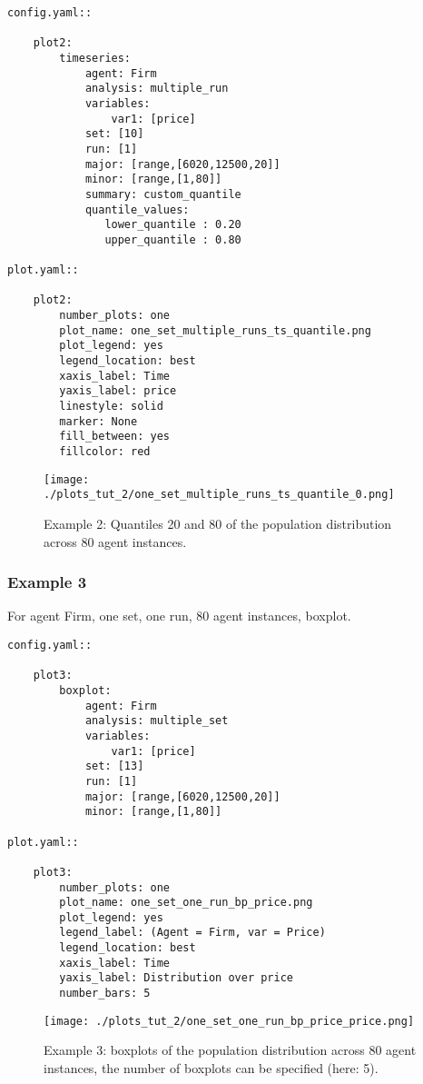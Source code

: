 \documentclass[10pt,a4paper]{article}
\begin{document}
\begin{lstlisting}
config.yaml::

    plot2:
        timeseries:
            agent: Firm
            analysis: multiple_run
            variables:
                var1: [price]
            set: [10]
            run: [1]
            major: [range,[6020,12500,20]]
            minor: [range,[1,80]] 
            summary: custom_quantile
            quantile_values:          
               lower_quantile : 0.20
               upper_quantile : 0.80

plot.yaml::

    plot2:
        number_plots: one
        plot_name: one_set_multiple_runs_ts_quantile.png
        plot_legend: yes
        legend_location: best
        xaxis_label: Time
        yaxis_label: price
        linestyle: solid
        marker: None
        fill_between: yes
        fillcolor: red
\end{lstlisting}

\begin{figure}[b!]\centering\leavevmode
\texttt{[image: ./plots\_tut\_2/one\_set\_multiple\_runs\_ts\_quantile\_0.png]}
\caption{\footnotesize  Example 2: Quantiles 20 and 80 of the population distribution across 80 agent instances.}
\end{figure}

\clearpage
\subsubsection{Example 3}
 For agent Firm, one set, one run, 80 agent instances, boxplot.

\begin{lstlisting}
config.yaml::

    plot3:
        boxplot:
            agent: Firm
            analysis: multiple_set
            variables:
                var1: [price]
            set: [13]
            run: [1]
            major: [range,[6020,12500,20]]
            minor: [range,[1,80]]

plot.yaml::

    plot3:
        number_plots: one
        plot_name: one_set_one_run_bp_price.png
        plot_legend: yes
        legend_label: (Agent = Firm, var = Price)
        legend_location: best
        xaxis_label: Time
        yaxis_label: Distribution over price
        number_bars: 5
\end{lstlisting}

\begin{figure}[b!]\centering\leavevmode
\texttt{[image: ./plots\_tut\_2/one\_set\_one\_run\_bp\_price\_price.png]}
\caption{\footnotesize  Example 3: boxplots of the population distribution across 80 agent instances, the number of boxplots can be specified (here: 5).}
\end{figure}
\end{document}

